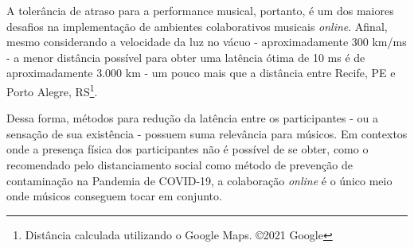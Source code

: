 A tolerância de atraso para a performance musical, portanto, é um dos maiores desafios na implementação de ambientes colaborativos musicais \textit{online}. Afinal, mesmo considerando a velocidade da luz no vácuo - aproximadamente 300 km/ms \cite{speed_of_light} - a menor distância possível para obter uma latência ótima de 10 ms é de aproximadamente 3.000 km - um pouco mais que a distância entre Recife, PE e Porto Alegre, RS\footnote{Distância calculada utilizando o Google Maps. ©2021 Google}.

Dessa forma, métodos para redução da latência entre os participantes - ou a sensação de sua existência - possuem suma relevância para músicos. Em contextos onde a presença física dos participantes não é possível de se obter, como o recomendado pelo distanciamento social como método de prevenção de contaminação na Pandemia de COVID-19, a colaboração \textit{online} é o único meio onde músicos conseguem tocar em conjunto.
